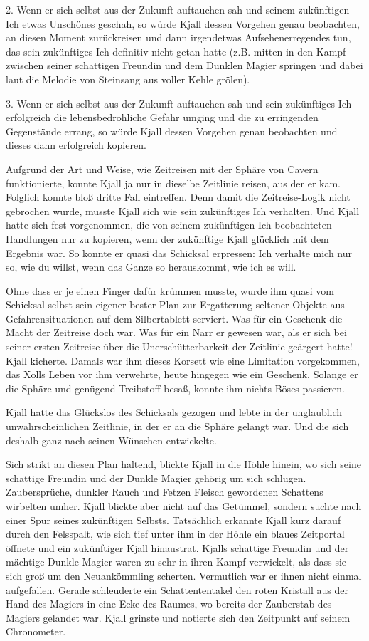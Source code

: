 2. Wenn er sich selbst aus der Zukunft auftauchen sah und seinem zukünftigen Ich etwas Unschönes geschah, so würde Kjall dessen Vorgehen genau beobachten, an diesen Moment zurückreisen und dann irgendetwas Aufsehenerregendes tun, das sein zukünftiges Ich definitiv nicht getan hatte (z.B. mitten in den Kampf zwischen seiner schattigen Freundin und dem Dunklen Magier springen und dabei laut die Melodie von Steinsang aus voller Kehle grölen).

3. Wenn er sich selbst aus der Zukunft auftauchen sah und sein zukünftiges Ich erfolgreich die lebensbedrohliche Gefahr umging und die zu erringenden Gegenstände errang, so würde Kjall dessen Vorgehen genau beobachten und dieses dann erfolgreich kopieren.

Aufgrund der Art und Weise, wie Zeitreisen mit der Sphäre von Cavern funktionierte, konnte Kjall ja nur in dieselbe Zeitlinie reisen, aus der er kam. Folglich konnte bloß dritte Fall eintreffen. Denn damit die Zeitreise-Logik nicht gebrochen wurde, musste Kjall sich wie sein zukünftiges Ich verhalten. Und Kjall hatte sich fest vorgenommen, die von seinem zukünftigen Ich beobachteten Handlungen nur zu kopieren, wenn der zukünftige Kjall glücklich mit dem Ergebnis war. So konnte er quasi das Schicksal erpressen: Ich verhalte mich nur so, wie du willst, wenn das Ganze so herauskommt, wie ich es will.

Ohne dass er je einen Finger dafür krümmen musste, wurde ihm quasi vom Schicksal selbst sein eigener bester Plan zur Ergatterung seltener Objekte aus Gefahrensituationen auf dem Silbertablett serviert. Was für ein Geschenk die Macht der Zeitreise doch war. Was für ein Narr er gewesen war, als er sich bei seiner ersten Zeitreise über die Unerschütterbarkeit der Zeitlinie geärgert hatte! Kjall kicherte. Damals war ihm dieses Korsett wie eine Limitation vorgekommen, das Xolls Leben vor ihm verwehrte, heute hingegen wie ein Geschenk. Solange er die Sphäre und genügend Treibstoff besaß, konnte ihm nichts Böses passieren.

Kjall hatte das Glückslos des Schicksals gezogen und lebte in der unglaublich unwahrscheinlichen Zeitlinie, in der er an die Sphäre gelangt war. Und die sich deshalb ganz nach seinen Wünschen entwickelte.

Sich strikt an diesen Plan haltend, blickte Kjall in die Höhle hinein, wo sich seine schattige Freundin und der Dunkle Magier gehörig um sich schlugen. Zaubersprüche, dunkler Rauch und Fetzen Fleisch gewordenen Schattens wirbelten umher. Kjall blickte aber nicht auf das Getümmel, sondern suchte nach einer Spur seines zukünftigen Selbsts. Tatsächlich erkannte Kjall kurz darauf durch den Felsspalt, wie sich tief unter ihm in der Höhle ein blaues Zeitportal öffnete und ein zukünftiger Kjall hinaustrat. Kjalls schattige Freundin und der mächtige Dunkle Magier waren zu sehr in ihren Kampf verwickelt, als dass sie sich groß um den Neuankömmling scherten. Vermutlich war er ihnen nicht einmal aufgefallen. Gerade schleuderte ein Schattententakel den roten Kristall aus der Hand des Magiers in eine Ecke des Raumes, wo bereits der Zauberstab des Magiers gelandet war. Kjall grinste und notierte sich den Zeitpunkt auf seinem Chronometer.

